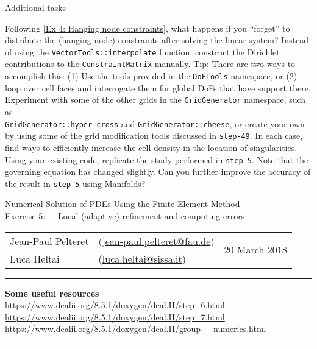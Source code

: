 \documentclass[11pt,answers]{exam}
\makeatletter
\newcommand{\makeheader}[3]{%
\setcounter{question}{0}
\begin{center}
{\sc Numerical Solution of PDEs Using the Finite Element Method}\vspace{2ex}\\
{\sc Exercise #1:\ \ \ #2}\vspace{2ex}\\
\begin{tabular*}{\textwidth}{ll @{\extracolsep{\fill}}r}
Jean-Paul Pelteret & (\url{jean-paul.pelteret@fau.de}) & \multirow{2}{*}{#3} \\
Luca Heltai & (\url{luca.heltai@sissa.it}) & \\
\end{tabular*}
\end{center}
}
\newcommand{\makeresources}[1]{%
\rule{\textwidth}{0.6mm}
\textbf{Some useful resources}\\[1.5ex]
#1 \par
\rule{\textwidth}{0.6mm}
}
\makeatother
\begin{document}
\begin{questions}
\question Additional tasks
\begin{parts}
\bonuspart Following \ref{Ex 4: Hanging node constraints}, what happens if you ``forget'' to distribute the (hanging node) constraints after solving the linear system?
\bonuspart Instead of using the \verb|VectorTools::interpolate| function, construct the Dirichlet contributions to the \verb|ConstraintMatrix| manually.
Tip: There are two ways to accomplish this: (1) Use the tools provided in the \verb|DoFTools| namespace, or (2) loop over cell faces and interrogate them for global DoFs that have support there.
\bonuspart Experiment with some of the other grids in the \verb|GridGenerator| namespace, such as \\\verb|GridGenerator::hyper_cross| and \verb|GridGenerator::cheese|, or create your own by using some of the grid modification tools discussed in \verb|step-49|.
In each case, find ways to efficiently increase the cell density in the location of singularities.
\bonuspart Using your existing code, replicate the study performed in \verb|step-5|. Note that the governing equation has changed slightly. Can you further improve the accuracy of the result in \verb|step-5| using Manifolds?
\end{parts}

\end{questions}




\clearpage
\makeheader{5}{Local (adaptive) refinement and computing errors}{20 March 2018}
\makeresources{%
\url{https://www.dealii.org/8.5.1/doxygen/deal.II/step_6.html} \\
\url{https://www.dealii.org/8.5.1/doxygen/deal.II/step_7.html} \\
\url{https://www.dealii.org/8.5.1/doxygen/deal.II/group__numerics.html}
}
\end{document}
